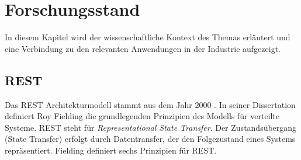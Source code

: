 \section{Forschungsstand}
In diesem Kapitel wird der wissenschaftliche Kontext des Themas erläutert und eine Verbindung zu den relevanten Anwendungen in der Industrie aufgezeigt.

\subsection{REST}
Das REST Architekturmodell stammt aus dem Jahr 2000 \parencite{fielding_architectural_2000}. In seiner Dissertation definiert Roy Fielding die grundlegenden Prinzipien des Modells für verteilte Systeme. REST steht für \textit{Representational State Transfer}. Der Zustandsübergang (State Transfer) erfolgt durch Datentransfer, der den Folgezustand eines Systems repräsentiert. Fielding definiert sechs Prinzipien für REST.
